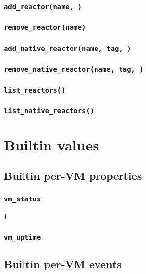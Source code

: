 \documentclass{note}
\begin{document}
\subsubsection{\textcolor{red2}{\texttt{add\_reactor(name, \textrm{})}}}
\subsubsection{\textcolor{red2}{\texttt{remove\_reactor(name)}}}
\subsubsection{\textcolor{red2}{\texttt{add\_native\_reactor(name, tag, \textrm{})}}}
\subsubsection{\textcolor{red2}{\texttt{remove\_native\_reactor(name, tag, \textrm{})}}}
\subsubsection{\textcolor{red2}{\texttt{list\_reactors()}}}
\subsubsection{\textcolor{red2}{\texttt{list\_native\_reactors()}}}


\section{Builtin values}
\subsection{Builtin per-VM properties}
\subsubsection{\textcolor{red2}{\texttt{vm\_status}}}

1\subsubsection{\textcolor{red2}{\texttt{vm\_uptime}}}


\subsection{Builtin per-VM events}
\end{document}

